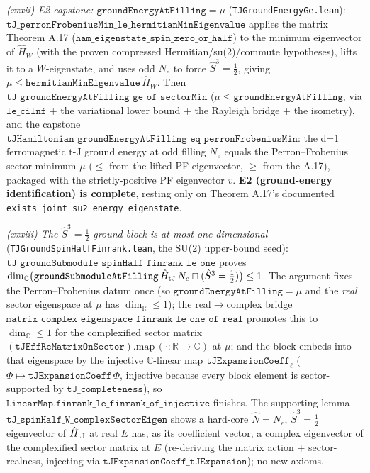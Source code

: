 \documentclass[a4paper,11pt]{article}
\begin{document}
\emph{(xxxii) E2 capstone: $\texttt{groundEnergyAtFilling}=\mu$} (\texttt{TJGroundEnergyGe.lean}):
$\texttt{tJ\_perronFrobeniusMin\_le\_hermitianMinEigenvalue}$ applies the matrix Theorem A.17
($\texttt{ham\_eigenstate\_spin\_zero\_or\_half}$) to the minimum eigenvector of $\hat H_W$ (with the
proven compressed Hermitian/su(2)/commute hypotheses), lifts it to a $W$-eigenstate, and uses odd
$N_e$ to force $\hat S^3=\tfrac12$, giving $\mu\le\texttt{hermitianMinEigenvalue}\,\hat H_W$.  Then
$\texttt{tJ\_groundEnergyAtFilling\_ge\_of\_sectorMin}$ ($\mu\le\texttt{groundEnergyAtFilling}$, via
$\texttt{le\_ciInf}$ + the variational lower bound + the Rayleigh bridge + the isometry), and the
capstone $\texttt{tJHamiltonian\_groundEnergyAtFilling\_eq\_perronFrobeniusMin}$: the d=1
ferromagnetic t-J ground energy at odd filling $N_e$ equals the Perron--Frobenius sector minimum
$\mu$ ($\le$ from the lifted PF eigenvector, $\ge$ from the A.17), packaged with the strictly-positive
PF eigenvector $v$.  \textbf{E2 (ground-energy identification) is complete}, resting only on Theorem
A.17's documented \texttt{exists\_joint\_su2\_energy\_eigenstate}.

\emph{(xxxiii) The $\hat S^3=\tfrac12$ ground block is at most one-dimensional}
(\texttt{TJGroundSpinHalfFinrank.lean}, the SU(2) upper-bound seed):
$\texttt{tJ\_groundSubmodule\_spinHalf\_finrank\_le\_one}$ proves
$\dim_{\mathbb C}\bigl(\texttt{groundSubmoduleAtFilling}\,\hat H_{\rm tJ}\,N_e \sqcap (\hat S^3=\tfrac12)\bigr)\le 1$.
The argument fixes the Perron--Frobenius datum once (so $\texttt{groundEnergyAtFilling}=\mu$ and the
\emph{real} sector eigenspace at $\mu$ has $\dim_{\mathbb R}\le 1$); the real$\to$complex bridge
$\texttt{matrix\_complex\_eigenspace\_finrank\_le\_one\_of\_real}$ promotes this to
$\dim_{\mathbb C}\le 1$ for the complexified sector matrix
$(\texttt{tJEffReMatrixOnSector}).\mathrm{map}\,(\cdot:\mathbb R\to\mathbb C)$ at $\mu$; and the block
embeds into that eigenspace by the injective $\mathbb C$-linear map $\texttt{tJExpansionCoeff}_\ell$
($\Phi\mapsto\texttt{tJExpansionCoeff}\,\Phi$, injective because every block element is
sector-supported by $\texttt{tJ\_completeness}$), so
$\texttt{LinearMap.finrank\_le\_finrank\_of\_injective}$ finishes.  The supporting lemma
$\texttt{tJ\_spinHalf\_W\_complexSectorEigen}$ shows a hard-core $\hat N=N_e$, $\hat S^3=\tfrac12$
eigenvector of $\hat H_{\rm tJ}$ at real $E$ has, as its coefficient vector, a complex eigenvector of
the complexified sector matrix at $E$ (re-deriving the matrix action + sector-realness, injecting via
$\texttt{tJExpansionCoeff\_tJExpansion}$); no new axioms.
\end{document}
